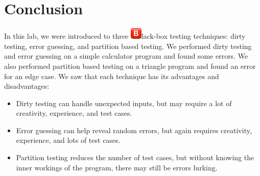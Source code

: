 \documentclass[12pt, letterpaper, titlepage]{article}
\newcommand{\B}{\includegraphics[height=1.5em, valign=B, raise=-0.2em]{BigB.png}}
\begin{document}
\section*{Conclusion}
In this lab, we were introduced to three \B lack-box testing techniques: dirty testing, error guessing, and partition based testing. We performed dirty testing and error guessing on a simple calculator program and found some errors. We also performed partition based testing on a triangle program and found an error for an edge case. We saw that each technique has its advantages and disadvantages:
\begin{itemize}
    \item Dirty testing can handle unexpected inputs, but may require a lot of creativity, experience, and test cases.
    \item Error guessing can help reveal random errors, but again requires creativity, experience, and lots of test cases.
    \item Partition testing reduces the number of test cases, but without knowing the inner workings of the program, there may still be errors lurking.
\end{itemize}
\end{document}

